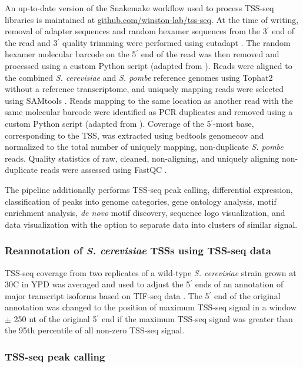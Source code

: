 An up-to-date version of the Snakemake \citep{koster2012} workflow used to process TSS-seq libraries is maintained at \href{https://github.com/winston-lab/tss-seq}{github.com/winston-lab/tss-seq}.
At the time of writing, removal of adapter sequences and random hexamer sequences from the 3$^\prime$ end of the read and 3$^\prime$ quality trimming were performed using cutadapt \citep{martin2011}.
The random hexamer molecular barcode on the 5$^\prime$ end of the read was then removed and processed using a custom Python script (adapted from \citet{mayer2015}).
Reads were aligned to the combined \textit{S. cerevisiae} and \textit{S. pombe} reference genomes using Tophat2 \citep{kim2013} without a reference transcriptome, and uniquely mapping reads were selected using SAMtools \citep{li2009}.
Reads mapping to the same location as another read with the same molecular barcode were identified as PCR duplicates and removed using a custom Python script (adapted from \citet{mayer2015}).
Coverage of the 5$^\prime$-most base, corresponding to the TSS, was extracted using bedtools genomecov \citep{quinlan2010} and normalized to the total number of uniquely mapping, non-duplicate \textit{S. pombe} reads.
Quality statistics of raw, cleaned, non-aligning, and uniquely aligning non-duplicate reads were assessed using FastQC \citep{andrews2014}.

The pipeline additionally performs TSS-seq peak calling, differential expression, classification of peaks into genome categories, gene ontology analysis, motif enrichment analysis, \textit{de novo} motif discovery, sequence logo visualization, and data visualization with the option to separate data into clusters of similar signal.

\subsubsection{Reannotation of \textit{S. cerevisiae} TSSs using TSS-seq data}

TSS-seq coverage from two replicates of a wild-type \textit{S. cerevisiae} strain grown at 30\textdegree C in YPD was averaged and used to adjust the 5$^\prime$ ends of an annotation of major transcript isoforms based on TIF-seq data \citep{pelechano2013}.
The 5$^\prime$ end of the original annotation was changed to the position of maximum TSS-seq signal in a window $\pm$ 250 nt of the original 5$^\prime$ end if the maximum TSS-seq signal was greater than the 95th percentile of all non-zero TSS-seq signal.

\subsubsection{TSS-seq peak calling}
\label{subsubsec:tss_peak_calling}

